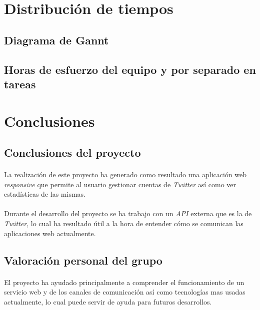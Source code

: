 \documentclass[a4paper]{article}
\begin{document}
\section{Distribución de tiempos}
	\subsection{Diagrama de Gannt}
	\subsection{Horas de esfuerzo del equipo y por separado en tareas}

\section{Conclusiones}
	\subsection{Conclusiones del proyecto}
	
		\paragraph{} La realización de este proyecto ha generado como resultado una aplicación web \textit{responsive} que permite al usuario gestionar cuentas de \textit{Twitter} así como ver estadísticas de las mismas.
		
		\paragraph{} Durante el desarrollo del proyecto se ha trabajo con un \textit{API} externa que es la de \textit{Twitter}, lo cual ha resultado útil a la hora de entender cómo se comunican las aplicaciones web actualmente. 
	
	\subsection{Valoración personal del grupo}
	
		\paragraph{} El proyecto ha ayudado principalmente a comprender el funcionamiento de un servicio web y de los canales de comunicación así como tecnologías mas usadas actualmente, lo cual puede servir de ayuda para futuros desarrollos.
	
\end{document}
